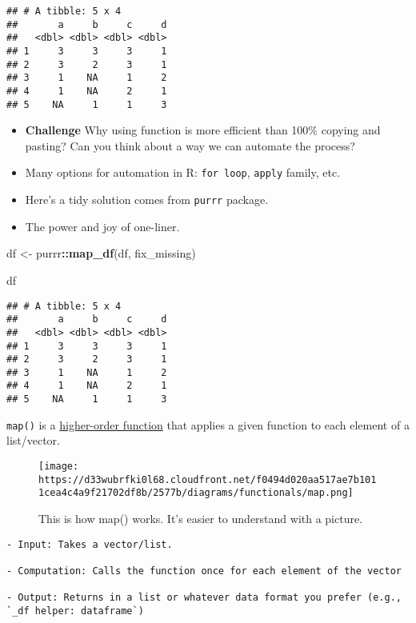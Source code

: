 \documentclass[
]{book}
\newenvironment{Shaded}{\begin{snugshade}}{\end{snugshade}}
\newcommand{\KeywordTok}[1]{\textcolor[rgb]{0.13,0.29,0.53}{\textbf{#1}}}
\newcommand{\NormalTok}[1]{#1}
\newcommand{\OperatorTok}[1]{\textcolor[rgb]{0.81,0.36,0.00}{\textbf{#1}}}
\newcommand{\StringTok}[1]{\textcolor[rgb]{0.31,0.60,0.02}{#1}}
\begin{document}
\begin{verbatim}
## # A tibble: 5 x 4
##       a     b     c     d
##   <dbl> <dbl> <dbl> <dbl>
## 1     3     3     3     1
## 2     3     2     3     1
## 3     1    NA     1     2
## 4     1    NA     2     1
## 5    NA     1     1     3
\end{verbatim}

\begin{itemize}
\item
  \textbf{Challenge} Why using function is more efficient than 100\% copying and pasting? Can you think about a way we can automate the process?
\item
  Many options for automation in R: \texttt{for\ loop}, \texttt{apply} family, etc.
\item
  Here's a tidy solution comes from \texttt{purrr} package.
\item
  The power and joy of one-liner.
\end{itemize}

\begin{Shaded}
\begin{Highlighting}[]
\NormalTok{df \textless{}{-}}\StringTok{ }\NormalTok{purrr}\OperatorTok{::}\KeywordTok{map\_df}\NormalTok{(df, fix\_missing)}

\NormalTok{df}
\end{Highlighting}
\end{Shaded}

\begin{verbatim}
## # A tibble: 5 x 4
##       a     b     c     d
##   <dbl> <dbl> <dbl> <dbl>
## 1     3     3     3     1
## 2     3     2     3     1
## 3     1    NA     1     2
## 4     1    NA     2     1
## 5    NA     1     1     3
\end{verbatim}

\texttt{map()} is a \href{https://en.wikipedia.org/wiki/Map_(higher-order_function)}{higher-order function} that applies a given function to each element of a list/vector.

\begin{figure}
\centering
\texttt{[image: https://d33wubrfki0l68.cloudfront.net/f0494d020aa517ae7b1011cea4c4a9f21702df8b/2577b/diagrams/functionals/map.png]}
\caption{This is how map() works. It's easier to understand with a picture.}
\end{figure}

\begin{verbatim}
- Input: Takes a vector/list. 

- Computation: Calls the function once for each element of the vector 

- Output: Returns in a list or whatever data format you prefer (e.g., `_df helper: dataframe`)
\end{verbatim}
\end{document}
